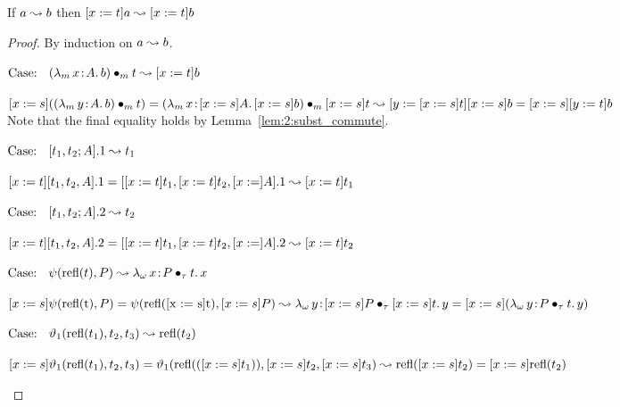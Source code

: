 \begin{lemma}
    If $a \leadsto b$ then $[x := t]a \leadsto [x := t]b$
    \label{lem:2:betared_subst}
\end{lemma}
\begin{proof}
    By induction on $a \leadsto b$.

    $\text{Case: }\begin{array}{c} ({\lambda_m}\, x\! : \! A.\, b) \bullet_{m} t \leadsto [x := t]b \end{array}$
    \begin{proofcase}
        $[x := s](({\lambda_m}\, y\! : \! A.\, b) \bullet_{m} t) = ({\lambda_m}\, x\! : \! [x := s]A.\, [x := s]b) \bullet_{m} [x := s]t \leadsto [y := [x := s]t][x := s]b = [x := s][y := t]b$ \\
        Note that the final equality holds by Lemma~\ref{lem:2:subst_commute}.
    \end{proofcase}

    $\text{Case: }\begin{array}{c} [t_1, t_2; A].1 \leadsto t_1 \end{array}$
    \begin{proofcase}
        $[x := t][t_1, t_2, A].1 = [[x := t]t_1, [x := t]t_2, [x := ]A].1 \leadsto [x := t]t_1$
    \end{proofcase}

    $\text{Case: }\begin{array}{c} [t_1, t_2; A].2 \leadsto t_2 \end{array}$
    \begin{proofcase}
        $[x := t][t_1, t_2, A].2 = [[x := t]t_1, [x := t]t_2, [x := ]A].2 \leadsto [x := t]t_2$
    \end{proofcase}

    $\text{Case: }\begin{array}{c} \psi(\text{refl}(t),P) \leadsto {\lambda_\omega}\, x\! : \! P \bullet_{\tau} t.\, x \end{array}$
    \begin{proofcase}
        $[x := s]\psi(\text{refl(t)}, P) = \psi(\text{refl([x := s]t)}, [x := s]P) \leadsto {\lambda_\omega}\, y\! : \! [x := s]P \bullet_{\tau} [x := s]t.\, y = [x := s]({\lambda_\omega}\, y\! : \! P \bullet_{\tau} t.\, y)$
    \end{proofcase}

    $\text{Case: }\begin{array}{c} \vartheta_1(\text{refl}(t_1), t_2, t_3) \leadsto \text{refl}(t_2) \end{array}$
    \begin{proofcase}
        $[x := s]\vartheta_1(\text{refl}(t_1), t_2, t_3) = \vartheta_1(\text{refl}(([x := s]t_1)), [x := s]t_2, [x := s]t_3) \leadsto \text{refl}([x := s]t_2) = [x := s]\text{refl}(t_2)$
    \end{proofcase}


\end{proof}
